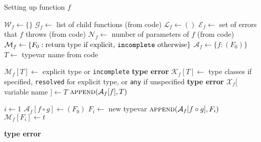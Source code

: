 \documentclass[10pt]{article}
\begin{document}
\begin{algorithm}
	\caption{Setting up function $f$}
	\begin{algorithmic}[1]
		\Statex
			\State $\mathcal{W}_f \gets \{\}$ 
			\State $\mathcal{G}_f \gets $ list of child functions (from code)
			\State $\mathcal{L}_f \gets ()$ 
			\State $\mathcal{E}_f \gets $ set of errors that $f$ throws (from
			code)
			\State $\mathcal{N}_f \gets $ number of parameters of $f$ (from
			code)
			\State $\mathcal{M}_f \gets \{F_0 : \textrm{return type if explicit,
				\texttt{incomplete} otherwise} \}$ 
				\State $\mathcal{A}_f \gets \{ f : (F_0) \}$ 
				\State $T \gets $ typevar name from code
				 

					\State $\mathcal{M}_f[T] \gets $ explicit type or
						\texttt{incomplete}
						\State \Return \textbf{type error}
					\EndIf
					\State $\mathcal{K}_f[T] \gets $ type classes if
					specified, \texttt{resolved} for explicit type, or
					\texttt{any} if unspecified 
						\State \Return \textbf{type error}
					\EndIf
				\EndIf
				\State $\mathcal{X}_f[$ variable name $] \gets T$ 
				\State $\Call{append}{\mathcal{A}_f[f], T}$ 
			\EndFor

			\State $i \gets 1$ 
					\State $\mathcal{A}_f[f \circ g] \gets (F_0)$
				\EndIf
						\State $F_i \gets $ new typevar
						\State $\Call{append}{\mathcal{A}_f[f \circ g], F_i}$ 
						\State $\mathcal{M}_f[F_i] \gets t$ 

							\State \Return \textbf{type error}
						\EndIf


\end{algorithmic}
\end{algorithm}
\end{document}
